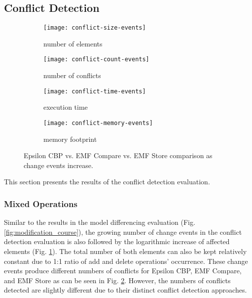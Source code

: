 \subsection{Conflict Detection}
\label{sec:conflict_results}

\begin{figure*}[ht]
    \centering
    \begin{subfigure}[t]{0.245\linewidth}
        \texttt{[image: conflict-size-events]}
        \caption{number of elements}
        \label{fig:conflict-size-events}
    \end{subfigure}
    \hfill
    \begin{subfigure}[t]{0.245\linewidth}
        \texttt{[image: conflict-count-events]}
        \caption{number of conflicts}
        \label{fig:conflict-count-events}
    \end{subfigure}
    \hfill
    \begin{subfigure}[t]{0.245\linewidth}
        \texttt{[image: conflict-time-events]}
        \caption{execution time}
        \label{fig:conflict-time-events}
    \end{subfigure}
    \hfill
    \begin{subfigure}[t]{0.245\linewidth}
        \texttt{[image: conflict-memory-events]}
        \caption{memory footprint}
        \label{fig:conflict-memory-events}
    \end{subfigure}
    \caption{Epsilon CBP vs. EMF Compare vs. EMF Store comparison as change events increase.}
    \label{fig:conflict_events}
\end{figure*}

This section presents the results of the conflict detection evaluation. 

\subsubsection{Mixed Operations}
\label{sec:mixed-operation_conflict}
Similar to the results in the model differencing evaluation (Fig. \ref{fig:modification_course}), the growing number of change events in the conflict detection evaluation is also followed by the logarithmic increase of affected elements (Fig. \ref{fig:conflict-size-events}). The total number of both elements can also be kept relatively constant due to 1:1 ratio of \textsf{add} and \textsf{delete} operations' occurrence. These change events produce different numbers of conflicts for Epsilon CBP, EMF Compare, and EMF Store as can be seen in Fig. \ref{fig:conflict-count-events}. However, the numbers of conflicts detected are slightly different due to their distinct conflict detection approaches. 

